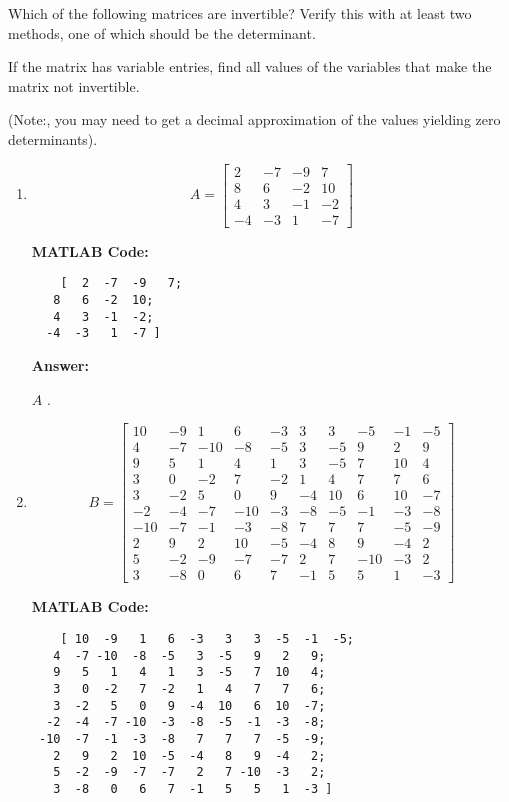 \documentclass{ximera}
\begin{document}
\begin{example}\label{ex:invertible}
    Which of the following matrices are invertible? Verify this with at least two methods, one of which should be the determinant.

    If the matrix has variable entries, find all values of the variables that make the matrix not invertible.

    (Note:, you may need to get a decimal approximation of the values yielding zero determinants).

    \begin{enumerate}
        \item \[
        A=\begin{bmatrix}  
            2 & -7 & -9 & 7 \\  
            8 & 6 & -2 & 10 \\  
            4 & 3 & -1 & -2 \\  
            -4 & -3 & 1 & -7  
            \end{bmatrix}  
            \]

\textbf{MATLAB Code:}
\begin{verbatim}
    [  2  -7  -9   7;
   8   6  -2  10;
   4   3  -1  -2;
  -4  -3   1  -7 ]
\end{verbatim}


    \textbf{Answer:}

    $A$ . 

    \item \[
B=\begin{bmatrix}  
10 & -9 & 1 & 6 & -3 & 3 & 3 & -5 & -1 & -5 \\  
4 & -7 & -10 & -8 & -5 & 3 & -5 & 9 & 2 & 9 \\  
9 & 5 & 1 & 4 & 1 & 3 & -5 & 7 & 10 & 4 \\  
3 & 0 & -2 & 7 & -2 & 1 & 4 & 7 & 7 & 6 \\  
3 & -2 & 5 & 0 & 9 & -4 & 10 & 6 & 10 & -7 \\  
-2 & -4 & -7 & -10 & -3 & -8 & -5 & -1 & -3 & -8 \\  
-10 & -7 & -1 & -3 & -8 & 7 & 7 & 7 & -5 & -9 \\  
2 & 9 & 2 & 10 & -5 & -4 & 8 & 9 & -4 & 2 \\  
5 & -2 & -9 & -7 & -7 & 2 & 7 & -10 & -3 & 2 \\  
3 & -8 & 0 & 6 & 7 & -1 & 5 & 5 & 1 & -3  
\end{bmatrix}  
\]

\textbf{MATLAB Code:}
\begin{verbatim}
    [ 10  -9   1   6  -3   3   3  -5  -1  -5;
   4  -7 -10  -8  -5   3  -5   9   2   9;
   9   5   1   4   1   3  -5   7  10   4;
   3   0  -2   7  -2   1   4   7   7   6;
   3  -2   5   0   9  -4  10   6  10  -7;
  -2  -4  -7 -10  -3  -8  -5  -1  -3  -8;
 -10  -7  -1  -3  -8   7   7   7  -5  -9;
   2   9   2  10  -5  -4   8   9  -4   2;
   5  -2  -9  -7  -7   2   7 -10  -3   2;
   3  -8   0   6   7  -1   5   5   1  -3 ]
\end{verbatim}


\end{enumerate}
\end{example}
\end{document}
